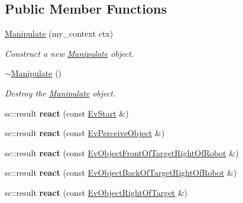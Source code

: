 \subsection*{Public Member Functions}
\begin{DoxyCompactItemize}
\item 
\hyperlink{structManipulate_ade8f8feaa7693b19b0038f3099218dec}{Manipulate} (my\+\_\+context ctx)
\begin{DoxyCompactList}\small\item\em Construct a new \hyperlink{structManipulate}{Manipulate} object. \end{DoxyCompactList}\item 
\mbox{\label{structManipulate_a7f88f9adaa854ff1eb2dd02331b36f58}} 
\hyperlink{structManipulate_a7f88f9adaa854ff1eb2dd02331b36f58}{$\sim$\+Manipulate} ()
\begin{DoxyCompactList}\small\item\em Destroy the \hyperlink{structManipulate}{Manipulate} object. \end{DoxyCompactList}\item 
\mbox{\label{structManipulate_a5e4d101e87c8741a40feb00fb8cde9d9}} 
sc\+::result {\bfseries react} (const \hyperlink{structEvStart}{Ev\+Start} \&)
\item 
\mbox{\label{structManipulate_a1fd71a2e39bc9e69b3ddc0e6f3b5201d}} 
sc\+::result {\bfseries react} (const \hyperlink{structEvPerceiveObject}{Ev\+Perceive\+Object} \&)
\item 
\mbox{\label{structManipulate_a53b0d346224cac7aa19afaec71a67a29}} 
sc\+::result {\bfseries react} (const \hyperlink{structEvObjectFrontOfTargetRightOfRobot}{Ev\+Object\+Front\+Of\+Target\+Right\+Of\+Robot} \&)
\item 
\mbox{\label{structManipulate_a8a41cdb3f91401e5a422f924873b67b0}} 
sc\+::result {\bfseries react} (const \hyperlink{structEvObjectBackOfTargetRightOfRobot}{Ev\+Object\+Back\+Of\+Target\+Right\+Of\+Robot} \&)
\item 
\mbox{\label{structManipulate_a2c35a0ae75f83971edbba9a970450b82}} 
sc\+::result {\bfseries react} (const \hyperlink{structEvObjectRightOfTarget}{Ev\+Object\+Right\+Of\+Target} \&)

\end{DoxyCompactItemize}
